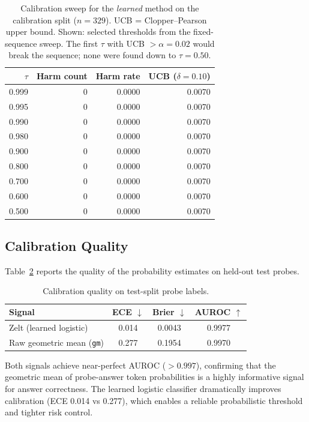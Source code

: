\documentclass[11pt]{article}
\begin{document}
\begin{table}[t]
\centering
\caption{Calibration sweep for the \emph{learned} method on the calibration
         split ($n=329$).  UCB = Clopper--Pearson upper bound.
         Shown: selected thresholds from the fixed-sequence sweep.
         The first $\tau$ with UCB $> \alpha=0.02$ would break the sequence;
         none were found down to $\tau=0.50$.}
\label{tab:caltable}
\small
\begin{tabular}{rrrr}
\toprule
$\tau$ & Harm count & Harm rate & UCB ($\delta=0.10$) \\
\midrule
0.999  & 0 & 0.0000 & 0.0070 \\
0.995  & 0 & 0.0000 & 0.0070 \\
0.990  & 0 & 0.0000 & 0.0070 \\
0.980  & 0 & 0.0000 & 0.0070 \\
0.900  & 0 & 0.0000 & 0.0070 \\
0.800  & 0 & 0.0000 & 0.0070 \\
0.700  & 0 & 0.0000 & 0.0070 \\
0.600  & 0 & 0.0000 & 0.0070 \\
0.500  & 0 & 0.0000 & 0.0070 \\
\bottomrule
\end{tabular}
\end{table}

\subsection{Calibration Quality}

Table~\ref{tab:calib} reports the quality of the probability estimates
on held-out test probes.

\begin{table}[h]
\centering
\caption{Calibration quality on test-split probe labels.}
\label{tab:calib}
\begin{tabular}{lccc}
\toprule
\textbf{Signal} & \textbf{ECE} $\downarrow$ & \textbf{Brier} $\downarrow$ & \textbf{AUROC} $\uparrow$ \\
\midrule
Zelt (learned logistic) & 0.014 & 0.0043 & 0.9977 \\
Raw geometric mean (\texttt{gm})     & 0.277 & 0.1954 & 0.9970 \\
\bottomrule
\end{tabular}
\end{table}

Both signals achieve near-perfect AUROC ($>0.997$), confirming that
the geometric mean of probe-answer token probabilities is a highly
informative signal for answer correctness.
The learned logistic classifier dramatically improves calibration
(ECE 0.014 vs 0.277), which enables a reliable probabilistic threshold
and tighter risk control.
\end{document}
